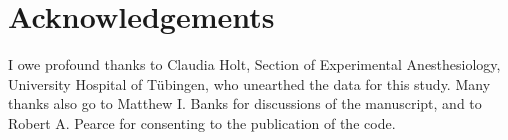 \section{Acknowledgements}
I owe profound thanks to Claudia Holt, Section of Experimental Anesthesiology, University Hospital of Tübingen, who unearthed the data for this study. Many thanks also go to Matthew I. Banks for discussions of the manuscript, and to Robert A. Pearce for consenting to the publication of the code.